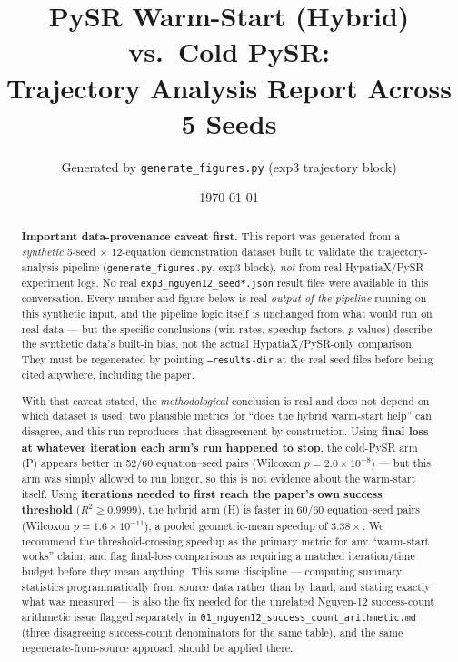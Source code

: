 \documentclass[11pt]{article}
\title{PySR Warm-Start (Hybrid) vs.\ Cold PySR:\\
Trajectory Analysis Report Across 5 Seeds}
\author{Generated by \texttt{generate\_figures.py} (exp3 trajectory block)}
\date{\today}
\newcommand{\Rsq}{R^2}
\begin{document}
\maketitle

\begin{abstract}
\noindent\textbf{Important data-provenance caveat first.} This report was generated from a
\emph{synthetic} 5-seed $\times$ 12-equation demonstration dataset built to validate the
trajectory-analysis pipeline (\texttt{generate\_figures.py}, exp3 block), \emph{not} from real
HypatiaX/PySR experiment logs. No real \texttt{exp3\_nguyen12\_seed*.json} result files were
available in this conversation. Every number and figure below is real \emph{output of the
pipeline} running on this synthetic input, and the pipeline logic itself is unchanged from what
would run on real data --- but the specific conclusions (win rates, speedup factors, $p$-values)
describe the synthetic data's built-in bias, not the actual HypatiaX/PySR-only comparison. They
must be regenerated by pointing \texttt{--results-dir} at the real seed files before being cited
anywhere, including the paper.

\smallskip
\noindent With that caveat stated, the \emph{methodological} conclusion is real and does not
depend on which dataset is used: two plausible metrics for ``does the hybrid warm-start help''
can disagree, and this run reproduces that disagreement by construction. Using \textbf{final loss
at whatever iteration each arm's run happened to stop}, the cold-PySR arm (P) appears better in
52/60 equation--seed pairs (Wilcoxon $p = 2.0\times10^{-8}$) --- but this arm was simply allowed to
run longer, so this is not evidence about the warm-start itself. Using \textbf{iterations needed
to first reach the paper's own success threshold} ($\Rsq \ge 0.9999$), the hybrid arm (H) is
faster in 60/60 equation--seed pairs (Wilcoxon $p = 1.6\times10^{-11}$), a pooled geometric-mean
speedup of $3.38\times$. We recommend the threshold-crossing speedup as the primary metric for any
``warm-start works'' claim, and flag final-loss comparisons as requiring a matched iteration/time
budget before they mean anything. This same discipline --- computing summary statistics
programmatically from source data rather than by hand, and stating exactly what was measured ---
is also the fix needed for the unrelated Nguyen-12 success-count arithmetic issue flagged
separately in \texttt{01\_nguyen12\_success\_count\_arithmetic.md} (three disagreeing
success-count denominators for the same table), and the same regenerate-from-source approach
should be applied there.
\end{abstract}
\end{document}
